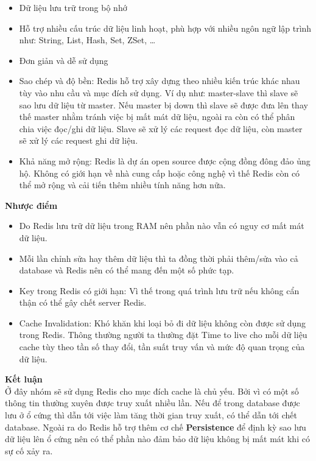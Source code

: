             \begin{itemize}
                \item Dữ liệu lưu trữ trong bộ nhớ
                \item Hỗ trợ nhiều cấu trúc dữ liệu linh hoạt, phù hợp với nhiều ngôn ngữ lập trình như: String, List, Hash, Set, ZSet, …
                \item Đơn giản và dễ sử dụng
                \item Sao chép và độ bền: Redis hỗ trợ xây dựng theo nhiều kiến trúc khác nhau tùy vào nhu cầu và mục đích sử dụng. Ví dụ như: master-slave thì slave sẽ sao lưu dữ liệu từ master. Nếu master bị down thì slave sẽ được đưa lên thay thế master nhằm tránh việc bị mất mát dữ liệu, ngoài ra còn có thể phân chia việc đọc/ghi dữ liệu. Slave sẽ xử lý các request đọc dữ liệu, còn master sẽ xử lý các request ghi dữ liệu.
                \item Khả năng mở rộng: Redis là dự án open source được cộng đồng đông đảo ủng hộ. Không có giới hạn về nhà cung cấp hoặc công nghệ vì thế Redis còn có thể mở rộng và cải tiến thêm nhiều tính năng hơn nữa.
            \end{itemize}
            
            \textbf{Nhược điểm}
            
            \begin{itemize}
                \item Do Redis lưu trữ dữ liệu trong RAM nên phần nào vẫn có nguy cơ mất mát dữ liệu.
                \item Mỗi lần chỉnh sửa hay thêm dữ liệu thì ta đồng thời phải thêm/sửa vào cả database và Redis nên có thể mang đến một số phức tạp.
                \item Key trong Redis có giới hạn: Vì thế trong quá trình lưu trữ nếu không cẩn thận có thể gây chết server Redis.
                \item Cache Invalidation: Khó khăn khi loại bỏ đi dữ liệu không còn được sử dụng trong Redis. Thông thường người ta thường đặt Time to live cho mỗi dữ liệu cache tùy theo tần số thay đổi, tần suất truy vấn và mức độ quan trọng của dữ liệu.
            \end{itemize}
            
            \textbf{Kết luận}\\
            
            Ở đây nhóm sẽ sử dụng Redis cho mục đích cache là chủ yếu. Bởi vì có một số thông tin thường xuyên được truy xuất nhiều lần. Nếu để trong database được lưu ở ổ cứng thì dẫn tới việc làm tăng thời gian truy xuất, có thể dẫn tới chết database. Ngoài ra do Redis hỗ trợ thêm cơ chế \textbf{Persistence} để định kỳ sao lưu dữ liệu lên ổ cứng nên có thể phần nào đảm bảo dữ liệu không bị mất mát khi có sự cố xảy ra.
            
